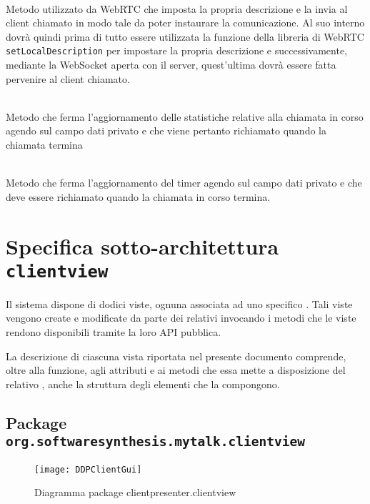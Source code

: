 \begin{description}
  \item{}\\
  Metodo utilizzato da WebRTC che imposta la propria descrizione e la invia al client chiamato in modo tale da poter instaurare la comunicazione. Al suo interno dovrà quindi prima di tutto essere utilizzata la funzione della libreria di WebRTC \verb'setLocalDescription' per impostare la propria descrizione e successivamente, mediante la WebSocket aperta con il server, quest'ultima dovrà essere fatta pervenire al client  chiamato.

  \item{}\\
  Metodo che ferma l'aggiornamento delle statistiche relative alla chiamata in corso agendo sul campo dati privato  e che viene pertanto richiamato quando la chiamata termina

  \item{}\\
  Metodo che ferma l'aggiornamento del timer agendo sul campo dati privato  e che deve essere richiamato quando la chiamata in corso termina.

\end{description}

\clearpage

\section{Specifica sotto-architettura \texttt{clientview}}\label{sec:clientviewarchitecture}
Il sistema dispone di dodici viste, ognuna associata ad uno specifico . Tali viste vengono create e modificate da parte dei relativi  invocando i metodi che le viste rendono disponibili tramite la loro API pubblica.

La descrizione di ciascuna vista riportata nel presente documento comprende, oltre alla funzione, agli attributi e ai metodi che essa mette a disposizione del relativo , anche la struttura degli elementi che la compongono.

\subsection{Package \texttt{org.softwaresynthesis.mytalk.clientview}}

\begin{center}
\begin{figure}[H]
  \texttt{[image: DDPClientGui]}
\caption{Diagramma package clientpresenter.clientview}
\end{figure}
\end{center}

